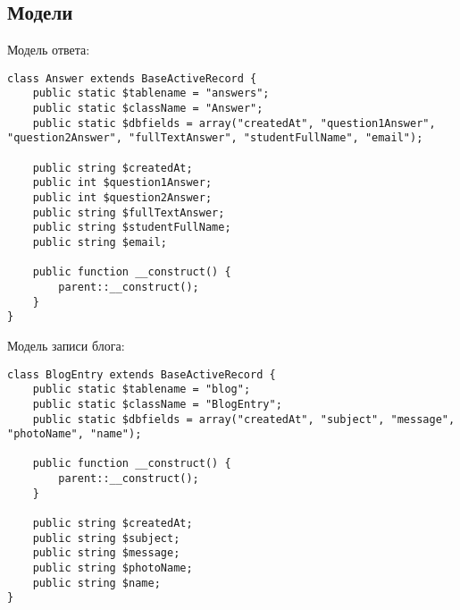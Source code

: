 \documentclass[a4paper,14pt]{extarticle}
\begin{document}
\subsection{Модели}
Модель ответа:
\begin{lstlisting}
class Answer extends BaseActiveRecord {
    public static $tablename = "answers";
    public static $className = "Answer";
    public static $dbfields = array("createdAt", "question1Answer", "question2Answer", "fullTextAnswer", "studentFullName", "email");

    public string $createdAt;
    public int $question1Answer;
    public int $question2Answer;
    public string $fullTextAnswer;
    public string $studentFullName;
    public string $email;

    public function __construct() {
        parent::__construct();
    }
}
\end{lstlisting}
Модель записи блога:
\begin{lstlisting}
class BlogEntry extends BaseActiveRecord {
    public static $tablename = "blog";
    public static $className = "BlogEntry";
    public static $dbfields = array("createdAt", "subject", "message", "photoName", "name");

    public function __construct() {
        parent::__construct();
    }

    public string $createdAt;
    public string $subject;
    public string $message;
    public string $photoName;
    public string $name;
}
\end{lstlisting}
\end{document}
